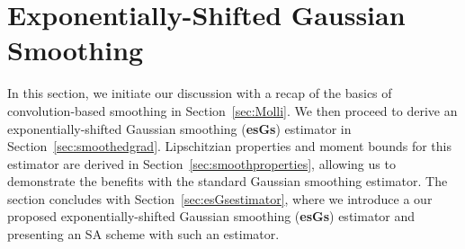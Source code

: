 \documentclass[11pt,reqno]{amsart}
\newcommand{\1}{{\bf 1}}
\newcommand{\2}{{\bf 2}}
\newcommand{\mr}[1]{{\color{blue}#1}}
\newcommand{\us}[1]{\textcolor{red}{#1}}
\numberwithin{equation}{section}
\theoremstyle{remark}
\begin{document}
		
			
			
		\section{Exponentially-Shifted Gaussian Smoothing}\label{sec:Estimator}
		
		In this section, we initiate our discussion with a recap of the basics of convolution-based smoothing in
		Section~\ref{sec:Molli}. We then proceed to derive an exponentially-shifted
		Gaussian smoothing ({\bf esGs}) estimator in Section~\ref{sec:smoothedgrad}.
		Lipschitzian properties and moment bounds for this estimator are derived in
		Section~\ref{sec:smoothproperties}, allowing us to demonstrate the benefits with
		the standard Gaussian smoothing estimator. The section concludes with
		Section~\ref{sec:esGsestimator}, where we introduce a our proposed exponentially-shifted
		Gaussian smoothing ({\bf esGs}) estimator  and presenting an SA scheme with such an
		estimator.  %
		
\end{document}
